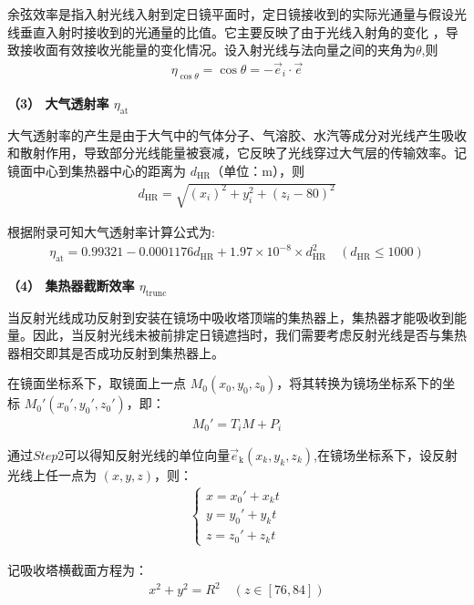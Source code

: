 \documentclass[../main.tex]{subfiles}
\begin{document}
\par 余弦效率是指入射光线入射到定日镜平面时，定日镜接收到的实际光通量与假设光线垂直入射时接收到的光通量的比值。它主要反映了由于光线入射角的变化 ，导致接收面有效接收光能量的变化情况。设入射光线与法向量之间的夹角为$\theta $,则
\begin{align}\label{1.35}
  \eta_{\cos\theta} = \cos\theta = -\vec{e}_i \cdot \vec{e}
\end{align}
\par \textbf{（3） 大气透射率 $\eta_{\text{at}}$}
\par 大气透射率的产生是由于大气中的气体分子、气溶胶、水汽等成分对光线产生吸收和散射作用，导致部分光线能量被衰减，它反映了光线穿过大气层的传输效率。记镜面中心到集热器中心的距离为 $d_{\text{HR}}$（单位：$\text{m}$），则
\begin{align}\label{1.36}
 d_{\text{HR}} = \sqrt{(x_i)^2 + y_i^2 + (z_i - 80)^2}
 \end{align}
\par 根据附录可知大气透射率计算公式为:
\begin{align}\label{1.36}
  \eta_{\text{at}} = 0.99321 - 0.0001176d_{\text{HR}} + 1.97 \times 10^{-8} \times d_{\text{HR}}^2 \quad (d_{\text{HR}} \leq 1000) 
\end{align}
\par \textbf{（4） 集热器截断效率 $\eta_{\text{trunc}}$}
\par 当反射光线成功反射到安装在镜场中吸收塔顶端的集热器上，集热器才能吸收到能量。因此，当反射光线未被前排定日镜遮挡时，我们需要考虑反射光线是否与集热器相交即其是否成功反射到集热器上。
\par 在镜面坐标系下，取镜面上一点 \( M_0(x_0, y_0, z_0) \)，将其转换为镜场坐标系下的坐标 \( M_0'(x_0', y_0', z_0') \)，即：
\begin{align}    \label{1.37}
M_0' = T_i M + P_i
\end{align}
\par 通过$Step 2$可以得知反射光线的单位向量$\vec{e}_{\text{k}}(x_k,y_k,z_k)$,在镜场坐标系下，设反射光线上任一点为 \( (x, y, z) \)，则：
\begin{align}\label{1.38}
  \begin{cases}
x = x_0' + x_k t \\
y = y_0' + y_k t \\
z = z_0' + z_k t
\end{cases}
\end{align}
\par 记吸收塔横截面方程为：
\begin{align}    \label{1.39}
x^2 + y^2 = R^2 \quad ( z \in [76, 84])
\end{align}
\end{document}
